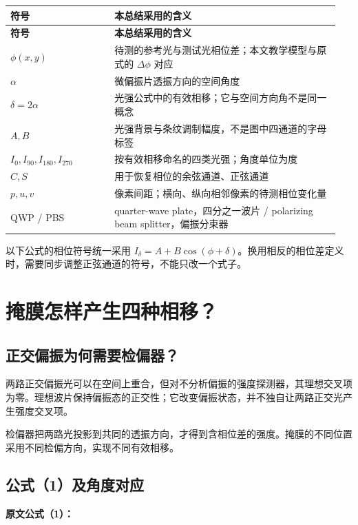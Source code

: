 \documentclass[UTF8,fontset=fandol,11pt,a4paper]{ctexart}
\begin{document}
{\small
\begin{longtable}{>{\raggedright\arraybackslash}p{0.3\linewidth}>{\raggedright\arraybackslash}p{0.65\linewidth}}
\toprule
\textbf{符号} & \textbf{本总结采用的含义} \\
\midrule
\endfirsthead
\toprule
\textbf{符号} & \textbf{本总结采用的含义} \\
\midrule
\endhead
\(\phi(x,y)\) & 待测的参考光与测试光相位差；本文教学模型与原式的 \(\Delta\phi\) 对应 \\
\(\alpha\) & 微偏振片透振方向的空间角度 \\
\(\delta=2\alpha\) & 光强公式中的有效相移；它与空间方向角不是同一概念 \\
\(A,B\) & 光强背景与条纹调制幅度，不是图中四通道的字母标签 \\
\(I_0,I_{90},I_{180},I_{270}\) & 按有效相移命名的四类光强；角度单位为度 \\
\(C,S\) & 用于恢复相位的余弦通道、正弦通道 \\
\(p,u,v\) & 像素间距；横向、纵向相邻像素的待测相位变化量 \\
QWP / PBS & quarter-wave plate，四分之一波片 / polarizing beam splitter，偏振分束器 \\
\bottomrule
\end{longtable}
}

以下公式的相位符号统一采用 \(I_\delta=A+B\cos(\phi+\delta)\)。换用相反的相位差定义时，需要同步调整正弦通道的符号，不能只改一个式子。

\section{掩膜怎样产生四种相移？}

\subsection{正交偏振为何需要检偏器？}

两路正交偏振光可以在空间上重合，但对不分析偏振的强度探测器，其理想交叉项为零。理想波片保持偏振态的正交性；它改变偏振状态，并不独自让两路正交光产生强度交叉项。

检偏器把两路光投影到共同的透振方向，才得到含相位差的强度。掩膜的不同位置采用不同检偏方向，实现不同有效相移。

\subsection{公式（1）及角度对应}

\textbf{原文公式（1）：}
\end{document}
